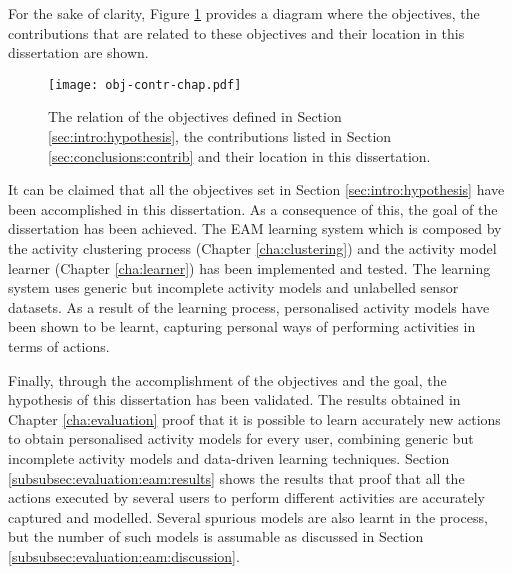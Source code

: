 For the sake of clarity, Figure \ref{fig-obj-contr-chap} provides a diagram where the objectives, the contributions that are related to these objectives and their location in this dissertation are shown.

\begin{figure}[htbp]
\centering
\texttt{[image: obj-contr-chap.pdf]}
    \caption{The relation of the objectives defined in Section \ref{sec:intro:hypothesis}, the contributions listed in Section \ref{sec:conclusions:contrib} and their location in this dissertation.}
    \label{fig-obj-contr-chap}
\end{figure}

It can be claimed that all the objectives set in Section \ref{sec:intro:hypothesis} have been accomplished in this dissertation. As a consequence of this, the goal of the dissertation has been achieved. The EAM learning system which is composed by the activity clustering process (Chapter \ref{cha:clustering}) and the activity model learner (Chapter \ref{cha:learner}) has been implemented and tested. The learning system uses generic but incomplete activity models and unlabelled sensor datasets. As a result of the learning process, personalised activity models have been shown to be learnt, capturing personal ways of performing activities in terms of actions.

Finally, through the accomplishment of the objectives and the goal, the hypothesis of this dissertation has been validated. The results obtained in Chapter \ref{cha:evaluation} proof that it is possible to learn accurately new actions to obtain personalised activity models for every user, combining generic but incomplete activity models and data-driven learning techniques. Section \ref{subsubsec:evaluation:eam:results} shows the results that proof that all the actions executed by several users to perform different activities are accurately captured and modelled. Several spurious models are also learnt in the process, but the number of such models is assumable as discussed in Section \ref{subsubsec:evaluation:eam:discussion}.